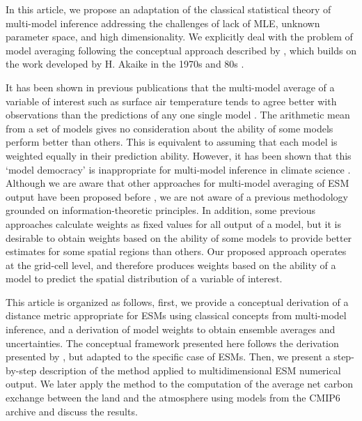 \documentclass[gmd, manuscript]{copernicus}
\begin{document}
In this article, we propose an adaptation of the classical statistical theory of multi-model inference addressing the challenges of lack of MLE, unknown parameter space, and high dimensionality. We explicitly deal with the problem of model averaging following the conceptual approach described by \citet{Burnham2002}, which builds on the work developed by H. Akaike in the 1970s and 80s \citep{Parzen1998}.

It has been shown in previous publications that the multi-model average of a variable of interest such as surface air temperature tends to agree better with observations than the predictions of any one single model \citep{Doblas-Reyes2003, Hagedorn2005, Elvidge2023}. The arithmetic mean from a set of models gives no consideration about the ability of some models perform better than others. This is equivalent to assuming that each model is weighted equally in their prediction ability. However, it has been shown that this `model democracy' is inappropriate for multi-model inference in climate science \citep{Knutti2010CC, Knutti2017}. Although we are aware that other approaches for multi-model averaging of ESM output have been proposed before \citep[e.g.,][]{Knutti2017, Ribes2021, Sanderson2015, Giorgi2002, Tebaldi2007, Tebaldi2005, Elvidge2023}, we are not aware of a previous methodology grounded on information-theoretic principles. In addition, some previous approaches calculate weights as fixed values for all output of a model, but it is desirable to obtain weights based on the ability of some models to provide better estimates for some spatial regions than others. Our proposed approach operates at the grid-cell level, and therefore produces weights based on the ability of a model to predict the spatial distribution of a variable of interest.

This article is organized as follows, first, we provide a conceptual derivation of a distance metric appropriate for ESMs using classical concepts from multi-model inference, and a derivation of model weights to obtain ensemble averages and uncertainties. The conceptual framework presented here follows the derivation presented by \citet{Burnham2002}, but adapted to the specific case of ESMs. Then, we present a step-by-step description of the method applied to multidimensional ESM numerical output. We later apply the method to the computation of the average net carbon exchange between the land and the atmosphere using models from the CMIP6 archive and discuss the results. 
\end{document}
